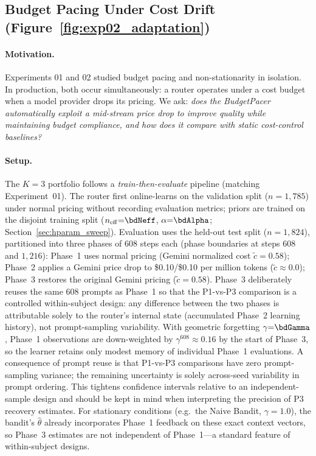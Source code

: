 
\subsection{Budget Pacing Under Cost Drift (Figure~\ref{fig:exp02_adaptation})}
\label{sec:budget_drift}

\paragraph{Motivation.}
Experiments 01 and 02 studied budget pacing and non-stationarity in
isolation.  In production, both occur simultaneously: a router
operates under a cost budget when a model provider drops its pricing.
We ask: \emph{does the BudgetPacer automatically exploit a mid-stream
price drop to improve quality while maintaining budget compliance,
and how does it compare with static cost-control baselines?}

\paragraph{Setup.}
The $K{=}3$ portfolio follows a \emph{train-then-evaluate} pipeline
(matching Experiment~01).
The router first online-learns on the validation split
($n{=}1{,}785$) under normal pricing without recording evaluation
metrics; priors are trained on the disjoint training split
($n_{\mathrm{eff}}{=}\bdNeff$, $\alpha{=}\bdAlpha$;
Section~\ref{sec:hparam_sweep}).
Evaluation uses the held-out test split ($n{=}1{,}824$),
partitioned into three phases of $608$ steps each
(phase boundaries at steps $608$ and $1{,}216$):
Phase~1 uses normal pricing (Gemini normalized cost
$\tilde{c}{=}0.58$); Phase~2 applies a Gemini price
drop to \$0.10/\$0.10 per million tokens ($\tilde{c} \approx 0.0$);
Phase~3 restores the original Gemini pricing
($\tilde{c}{=}0.58$).
Phase~3 deliberately reuses the same 608 prompts as Phase~1 so that
the P1-vs-P3 comparison is a controlled within-subject design: any
difference between the two phases is attributable solely to the
router's internal state (accumulated Phase~2 learning history), not
prompt-sampling variability.
With geometric forgetting $\gamma{=}\bdGamma$, Phase~1 observations are
down-weighted by $\gamma^{608}\approx 0.16$ by the start of Phase~3,
so the learner retains only modest memory of individual Phase~1
evaluations.
A consequence of prompt reuse is that P1-vs-P3 comparisons have
zero prompt-sampling variance; the remaining uncertainty is solely
across-seed variability in prompt ordering.  This tightens confidence
intervals relative to an independent-sample design and should be
kept in mind when interpreting the precision of P3 recovery
estimates.
For stationary conditions (e.g.\ the Naive Bandit, $\gamma{=}1.0$),
the bandit's $\hat{\theta}$ already incorporates Phase~1 feedback
on these exact context vectors, so Phase~3 estimates are not
independent of Phase~1---a standard feature of within-subject
designs.

